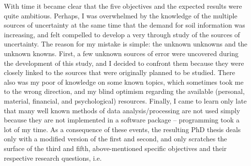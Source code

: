 With time it became clear that the five objectives and the expected results were quite ambitious. 
Perhaps, I was overwhelmed by the knowledge of the multiple sources of uncertainty at the same time 
that the demand for soil information was increasing, and felt compelled to develop a very through 
study of the sources of uncertainty. The reason for my mistake is simple: the unknown unknowns and
the unknown knowns. First, a few unknown sources of error were uncovered during the development of 
this study, and I decided to confront them because they were closely linked to the sources that were
originally planned to be studied. There also was my poor of knowledge on some known topics, which 
sometimes took me to the wrong direction, and my blind optimism regarding the available (personal, 
material, financial, and psychological) resources. Finally, I came to learn only late that many 
well known methods of data analysis/processing are not used simply because they are not implemented
in a software package -- programming took a lot of my time. As a consequence of these events, the 
resulting PhD thesis deals only with a modified version of the first and second, and only scratches 
the surface of the third and fifth, above-mentioned specific objectives and their respective 
research questions, i.e.

